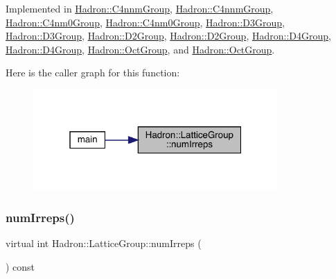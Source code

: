 Implemented in \mbox{\hyperlink{structHadron_1_1C4nnmGroup_a70b7d429c62a7f1b2ed77cbc3566ea42}{Hadron\+::\+C4nnm\+Group}}, \mbox{\hyperlink{structHadron_1_1C4nnmGroup_a70b7d429c62a7f1b2ed77cbc3566ea42}{Hadron\+::\+C4nnm\+Group}}, \mbox{\hyperlink{structHadron_1_1C4nm0Group_ac77e1943ad8fa5f9211d31dc34ee3f6c}{Hadron\+::\+C4nm0\+Group}}, \mbox{\hyperlink{structHadron_1_1C4nm0Group_ac77e1943ad8fa5f9211d31dc34ee3f6c}{Hadron\+::\+C4nm0\+Group}}, \mbox{\hyperlink{structHadron_1_1D3Group_a33e3822d1ec56e4928e5bc47b655f69f}{Hadron\+::\+D3\+Group}}, \mbox{\hyperlink{structHadron_1_1D3Group_a33e3822d1ec56e4928e5bc47b655f69f}{Hadron\+::\+D3\+Group}}, \mbox{\hyperlink{structHadron_1_1D2Group_a24644ff5f0fc06adeb26457c9ce772a5}{Hadron\+::\+D2\+Group}}, \mbox{\hyperlink{structHadron_1_1D2Group_a24644ff5f0fc06adeb26457c9ce772a5}{Hadron\+::\+D2\+Group}}, \mbox{\hyperlink{structHadron_1_1D4Group_ae8b007038fb1aa79a7267feebf356d4c}{Hadron\+::\+D4\+Group}}, \mbox{\hyperlink{structHadron_1_1D4Group_ae8b007038fb1aa79a7267feebf356d4c}{Hadron\+::\+D4\+Group}}, \mbox{\hyperlink{structHadron_1_1OctGroup_aed56aa6c4ed7e2a82048b478c916b9d2}{Hadron\+::\+Oct\+Group}}, and \mbox{\hyperlink{structHadron_1_1OctGroup_aed56aa6c4ed7e2a82048b478c916b9d2}{Hadron\+::\+Oct\+Group}}.

Here is the caller graph for this function\+:\nopagebreak
\begin{figure}[H]
\begin{center}
\leavevmode
\includegraphics[width=265pt]{dd/d2e/structHadron_1_1LatticeGroup_a3edaca488144b5d2a9cf73fe653add34_icgraph}
\end{center}
\end{figure}
\mbox{\label{structHadron_1_1LatticeGroup_a3edaca488144b5d2a9cf73fe653add34}} 
\subsubsection{\texorpdfstring{numIrreps()}{numIrreps()}\hspace{0.1cm}{\footnotesize\ttfamily [2/2]}}
{\footnotesize\ttfamily virtual int Hadron\+::\+Lattice\+Group\+::num\+Irreps (\begin{DoxyParamCaption}{ }\end{DoxyParamCaption}) const\hspace{0.3cm}{\ttfamily [pure virtual]}}

